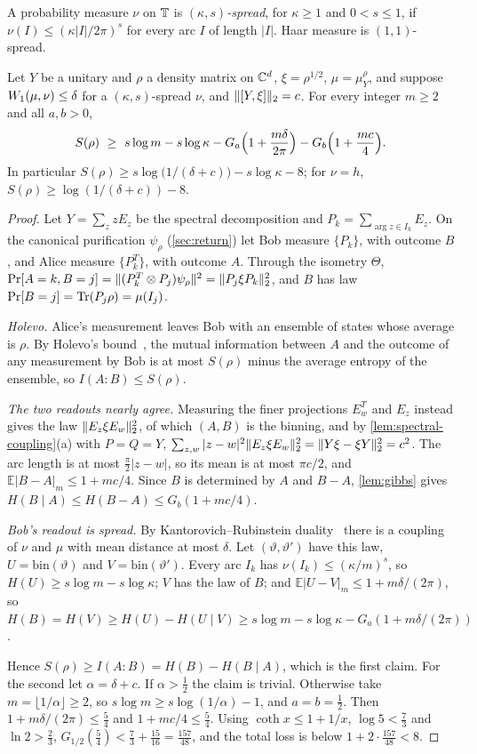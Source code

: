A probability measure $\nu$ on $\mathbb T$ is \emph{$(\kappa,s)$-spread}, for $\kappa\ge1$ and $0<s\le1$, if
$\nu(I)\le(\kappa|I|/2\pi)^s$ for every arc $I$ of length $|I|$. Haar measure is $(1,1)$-spread.

\begin{theorem}\label{thm:entropy-transport}
Let $Y$ be a unitary and $\rho$ a density matrix on $\mathbb C^d$, $\xi=\rho^{1/2}$, $\mu=\mu^\rho_Y$, and suppose
$W_1(\mu,\nu)\le\delta$ for a $(\kappa,s)$-spread $\nu$, and $\lVert [Y,\xi]\rVert_2=c$. For every integer $m\ge2$ and all $a,b>0$,
\[
S(\rho)\ \ge\ s\log m-s\log\kappa-G_a\Bigl(1+\frac{m\delta}{2\pi}\Bigr)-G_b\Bigl(1+\frac{mc}4\Bigr).
\]
In particular $S(\rho)\ge s\log\bigl(1/(\delta+c)\bigr)-s\log\kappa-8$; for $\nu=h$, $S(\rho)\ge\log(1/(\delta+c))-8$.
\end{theorem}

\begin{proof}
Let $Y=\sum_zzE_z$ be the spectral decomposition and $P_k=\sum_{\arg z\in I_k}E_z$. On the canonical purification
$\psi_\rho$ (\cref{sec:return}) let Bob measure $\{P_k\}$, with outcome $B$, and Alice measure $\{P_k^T\}$, with outcome
$A$. Through the isometry $\Theta$, $\Pr[A=k,B=j]=\lVert(P_k^T\otimes P_j)\psi_\rho\rVert^2=\lVert P_j\xi P_k\rVert_2^2$, and $B$ has law
$\Pr[B=j]=\operatorname{Tr}(P_j\rho)=\mu(I_j)$.

\emph{Holevo.} Alice's measurement leaves Bob with an ensemble of states whose average is $\rho$. By Holevo's
bound~\cite{Hol73}, the mutual information between $A$ and the outcome of any measurement by Bob is at most
$S(\rho)$ minus the average entropy of the ensemble, so $I(A:B)\le S(\rho)$.

\emph{The two readouts nearly agree.} Measuring the finer projections $E_w^T$ and $E_z$ instead gives the law
$\lVert E_z\xi E_w\rVert_2^2$, of which $(A,B)$ is the binning, and by \cref{lem:spectral-coupling}(a) with $P=Q=Y$,
$\sum_{z,w}|z-w|^2\lVert E_z\xi E_w\rVert_2^2=\lVert Y\xi-\xi Y\rVert_2^2=c^2$. The arc length is at most $\frac\pi2|z-w|$, so its mean is at most
$\pi c/2$, and $\mathbb E|B-A|_m\le1+mc/4$. Since $B$ is determined by $A$ and $B-A$, \cref{lem:gibbs} gives
$H(B\mid A)\le H(B-A)\le G_b(1+mc/4)$.

\emph{Bob's readout is spread.} By Kantorovich--Rubinstein duality~\cite[Chapter~5]{Vil09} there is a coupling of $\nu$ and
$\mu$ with mean distance at most $\delta$. Let $(\vartheta,\vartheta')$ have this law, $U=\mathrm{bin}(\vartheta)$ and
$V=\mathrm{bin}(\vartheta')$. Every arc $I_k$ has $\nu(I_k)\le(\kappa/m)^s$, so $H(U)\ge s\log m-s\log\kappa$; $V$ has the law of
$B$; and $\mathbb E|U-V|_m\le1+m\delta/(2\pi)$, so $H(B)=H(V)\ge H(U)-H(U\mid V)\ge s\log m-s\log\kappa-G_a(1+m\delta/(2\pi))$.

Hence $S(\rho)\ge I(A:B)=H(B)-H(B\mid A)$, which is the first claim. For the second let $\alpha=\delta+c$. If $\alpha>\frac12$
the claim is trivial. Otherwise take $m=\lfloor1/\alpha\rfloor\ge2$, so $s\log m\ge s\log(1/\alpha)-1$, and $a=b=\frac12$. Then
$1+m\delta/(2\pi)\le\frac54$ and $1+mc/4\le\frac54$. Using $\coth x\le1+1/x$, $\log5<\frac73$ and $\ln2>\frac23$,
$G_{1/2}(\frac54)<\frac73+\frac{15}{16}=\frac{157}{48}$, and the total loss is below $1+2\cdot\frac{157}{48}<8$.
\end{proof}

